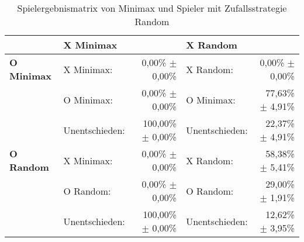 \begin{table}
\centering
\caption{Spielergebnismatrix von Minimax und Spieler mit Zufallsstrategie Random}
\label{tab:resultmatrix_baseline}

\begin{tabular}{llrlr}
\toprule
 & \multicolumn{2}{l}{\textbf{X Minimax}} & \multicolumn{2}{l}{\textbf{X Random}} \\ \midrule
\textbf{O Minimax}  & X Minimax:        & 0,00\% $\pm$    0,00\%            & X Random:         & 0,00\% $\pm$ 0,00\%  \\
                    & O Minimax:        & 0,00\% $\pm$    0,00\%            & O Minimax:        & 77,63\% $\pm$ 4,91\%  \\
                    & Unentschieden:    & 100,00\% $\pm$  0,00\%            & Unentschieden:    & 22,37\% $\pm$ 4,91\%  \\ \cmidrule{2-5}
\textbf{O Random}   & X Minimax:        & 0,00\% $\pm$    0,00\%            & X Random:         & 58,38\% $\pm$ 5,41\%  \\
                    & O Random:         & 0,00\% $\pm$    0,00\%            & O Random:         & 29,00\% $\pm$ 1,91\%  \\
                    & Unentschieden:    & 100,00\% $\pm$  0,00\%            & Unentschieden:    & 12,62\% $\pm$ 3,95\%  \\ \bottomrule
\end{tabular}
\end{table}